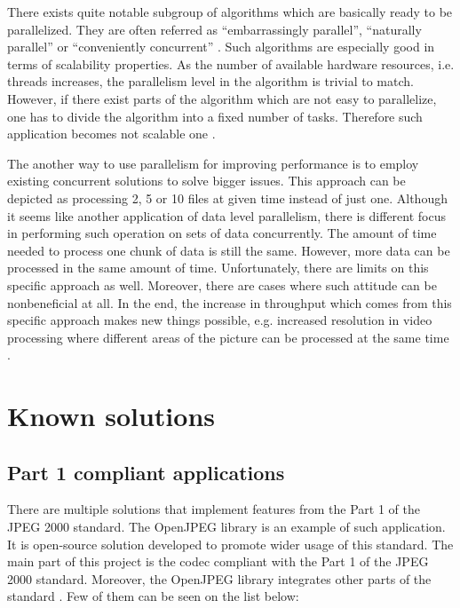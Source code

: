 There exists quite notable subgroup of algorithms which are basically ready to be parallelized.
They are often referred as ``embarrassingly parallel'', ``naturally parallel'' or
``conveniently concurrent'' \cite{cpp_concurrency}. Such algorithms are especially good in terms
of scalability properties. As the number of available hardware resources, i.e. threads
increases, the parallelism level in the algorithm is trivial to match. However, if there exist
parts of the algorithm which are not easy to parallelize, one has to divide the algorithm
into a fixed number of tasks. Therefore such application becomes not scalable one \cite{cpp_concurrency}.

The another way to use parallelism for improving performance is to employ existing concurrent
solutions to solve bigger issues. This approach can be depicted as processing 2, 5 or 10 files at
given time instead of just one. Although it seems like another application of data level parallelism,
there is different focus in performing such operation on sets of data concurrently.
The amount of time needed to process one chunk of data is still the same. However, more data
can be processed in the same amount of time. Unfortunately, there are limits on this specific
approach as well. Moreover, there are cases where such attitude can be nonbeneficial at all.
In the end, the increase in throughput which comes from this specific approach makes
new things possible, e.g. increased resolution in video processing where different areas
of the picture can be processed at the same time \cite{cpp_concurrency}.
    

\section{Known solutions}

\subsection{Part 1 compliant applications} \label{sec:part_1}

There are multiple solutions that implement features from the Part 1 of the JPEG 2000 standard.
The OpenJPEG library is an example of such application. It is open-source solution developed to
promote wider usage of this standard. The main part of this project is the codec compliant with
the Part 1 of the JPEG 2000 standard. Moreover, the OpenJPEG library integrates other parts
of the standard \cite{jpeg_suite}. Few of them can be seen on the list below:

